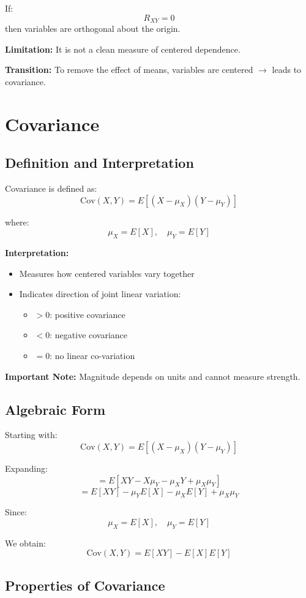 \documentclass[12pt]{article}
\begin{document}
If:
\[
R_{XY} = 0
\]
then variables are orthogonal about the origin.

\textbf{Limitation:} It is not a clean measure of centered dependence.

\textbf{Transition:} To remove the effect of means, variables are centered $\rightarrow$ leads to covariance.

\section{Covariance}

\subsection{Definition and Interpretation}

Covariance is defined as:
\[
\text{Cov}(X,Y) = E[(X - \mu_X)(Y - \mu_Y)]
\]

where:
\[
\mu_X = E[X], \quad \mu_Y = E[Y]
\]

\textbf{Interpretation:}
\begin{itemize}
    \item Measures how centered variables vary together
    \item Indicates direction of joint linear variation:
    \begin{itemize}
        \item $> 0$: positive covariance
        \item $< 0$: negative covariance
        \item $= 0$: no linear co-variation
    \end{itemize}
\end{itemize}

\textbf{Important Note:} Magnitude depends on units and cannot measure strength.

\subsection{Algebraic Form}

Starting with:
\[
\text{Cov}(X,Y) = E[(X - \mu_X)(Y - \mu_Y)]
\]

Expanding:
\[
= E[XY - X\mu_Y - \mu_X Y + \mu_X \mu_Y]
\]
\[
= E[XY] - \mu_Y E[X] - \mu_X E[Y] + \mu_X \mu_Y
\]

Since:
\[
\mu_X = E[X], \quad \mu_Y = E[Y]
\]

We obtain:
\[
\text{Cov}(X,Y) = E[XY] - E[X]E[Y]
\]

\subsection{Properties of Covariance}
\end{document}
